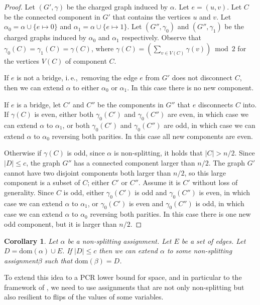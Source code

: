 \documentclass[11pt]{article}
\numberwithin{equation}{section}
\newtheorem{corollary}[theorem]{Corollary}
\theoremstyle{definition}
\theoremstyle{plain}
\newcommand{\ie}{i.\,e.}
\theoremstyle{plain}
\theoremstyle{definition}
\newcommand{\domainof}[1]{\ensuremath{\mathrm{dom} ( #1 )}}
\newcommand{\set}[1]{\{ #1 \}}
\newcommand{\setsize}[1]{\lvert#1\rvert}
\newcommand{\union}{\cup}
\newcommand{\ieComma}{\ie,\ }
\newcommand{\connectivityexpansionnot}{c}
\newcommand{\chargedgraph}{charged graph\xspace}
\newcommand{\chargedgraphs}{charged graphs\xspace}
\newcommand{\inducedgraph}[1]{\chargedgraph induced by #1\xspace}
\newcommand{\inducedgraphs}[1]{\chargedgraphs induced by #1\xspace}
\newcommand{\nonsplitting}{non-splitting\xspace}
\newcommand{\nonsplittingassignment}{\nonsplitting assignment\xspace}
\begin{document}
\begin{proof}
  Let $(G',\gamma)$ be the \inducedgraph{$\alpha$}. Let $e=(u,v)$. Let $C$ be the connected component in $G'$ that contains the vertices $u$ and $v$. Let $\alpha_0=\alpha\union\set{e\mapsto 0}$ and $\alpha_1=\alpha\union\set{e\mapsto 1}$. Let $(G'',\gamma_0)$ and $(G'',\gamma_1)$ be the \inducedgraphs{$\alpha_0$ and $\alpha_1$ respectively}. Observe that $\gamma_0(C)=\gamma_1(C)=\gamma(C)$, where $\gamma(C) = \left(\sum_{v \in V(C)} \gamma(v)\right) \bmod 2$ for the vertices $V(C)$ of component $C$.

If $e$ is not a bridge, \ieComma removing the edge $e$ from $G'$ does not disconnect $C$, then we can extend $\alpha$ to either $\alpha_0$ or $\alpha_1$. In this case there is no new component.

If $e$ is a bridge, let $C'$ and $C''$ be the components in $G''$ that $e$ disconnects $C$ into. If $\gamma(C)$ is even, either both $\gamma_0(C')$ and $\gamma_0(C'')$ are even, in which case we can extend $\alpha$ to $\alpha_1$, or both $\gamma_0(C')$ and $\gamma_0(C'')$ are odd, in which case we can extend $\alpha$ to $\alpha_0$ reversing both parities. In this case all new components are even.

Otherwise if $\gamma(C)$ is odd, since $\alpha$ is \nonsplitting, it holds that $\setsize{C}>n/2$. Since $\setsize{D}\leq c$, the graph $G''$ has a connected component larger than $n/2$. The graph $G'$ cannot have two disjoint components both larger than $n/2$, so this large component is a subset of $C$; either $C'$ or $C''$. Assume it is $C'$ without loss of generality. Since $C$ is odd, either $\gamma_0(C')$ is odd and $\gamma_0(C'')$ is even, in which case we can extend $\alpha$ to $\alpha_1$, or $\gamma_0(C')$ is even and $\gamma_0(C'')$ is odd, in which case we can extend $\alpha$ to $\alpha_0$ reversing both parities. In this case there is one new odd component, but it is larger than $n/2$.
\end{proof}
\begin{corollary}
  \label{cor:extend-non-splitting}
  Let $\alpha$ be a \nonsplittingassignment. Let $E$ be a set of edges. Let $D=\domainof{\alpha}\union E$. If $\setsize{D}\leq \connectivityexpansionnot$ then we can extend $\alpha$ to some \nonsplittingassignment $\beta$ such that $\domainof{\beta}=D$.
\end{corollary}

To extend this idea to a PCR lower bound for space, and in particular to the framework of \cite{BG15Framework}, we need to use assignments that are not only \nonsplitting{} but also resilient to flips of the values of some variables.
\end{document}
